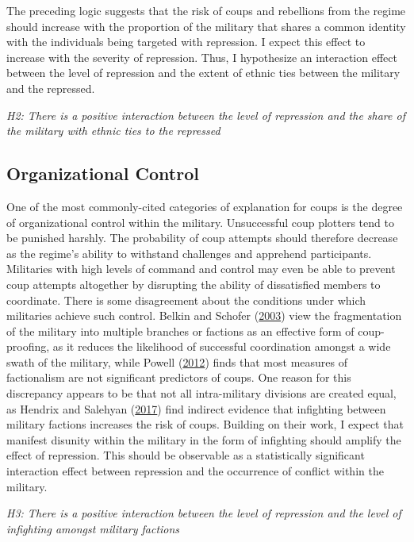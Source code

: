 \documentclass[12pt,]{article}
\theoremstyle{definition}
\theoremstyle{definition}
\theoremstyle{definition}
\theoremstyle{remark}
\begin{document}
The preceding logic suggests that the risk of coups and rebellions from
the regime should increase with the proportion of the military that
shares a common identity with the individuals being targeted with
repression. I expect this effect to increase with the severity of
repression. Thus, I hypothesize an interaction effect between the level
of repression and the extent of ethnic ties between the military and the
repressed.

\noindent \textit{H2: There is a positive interaction between the level of repression and the share of the military with ethnic ties to the repressed}

\hypertarget{organizational-control}{%
\subsection{Organizational Control}\label{organizational-control}}

One of the most commonly-cited categories of explanation for coups is
the degree of organizational control within the military. Unsuccessful
coup plotters tend to be punished harshly. The probability of coup
attempts should therefore decrease as the regime's ability to withstand
challenges and apprehend participants. Militaries with high levels of
command and control may even be able to prevent coup attempts altogether
by disrupting the ability of dissatisfied members to coordinate. There
is some disagreement about the conditions under which militaries achieve
such control. Belkin and Schofer
(\protect\hyperlink{ref-Belkin2003}{2003}) view the fragmentation of the
military into multiple branches or factions as an effective form of
coup-proofing, as it reduces the likelihood of successful coordination
amongst a wide swath of the military, while Powell
(\protect\hyperlink{ref-Powell2012a}{2012}) finds that most measures of
factionalism are not significant predictors of coups. One reason for
this discrepancy appears to be that not all intra-military divisions are
created equal, as Hendrix and Salehyan
(\protect\hyperlink{ref-Hendrix2017}{2017}) find indirect evidence that
infighting between military factions increases the risk of coups.
Building on their work, I expect that manifest disunity within the
military in the form of infighting should amplify the effect of
repression. This should be observable as a statistically significant
interaction effect between repression and the occurrence of conflict
within the military.

\noindent \textit{H3: There is a positive interaction between the level of repression and the level of infighting amongst military factions}
\end{document}
